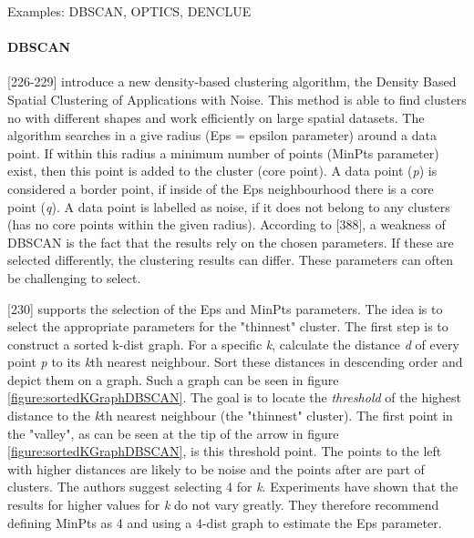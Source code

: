   Examples: DBSCAN, OPTICS, DENCLUE



\paragraph{DBSCAN}
\textcite{DBSCAN}[226-229] introduce a new density-based clustering algorithm, the Density Based Spatial Clustering of Applications with Noise. This method is able to find clusters no with different shapes and work efficiently on large spatial datasets. The algorithm searches in a give radius (Eps = epsilon parameter) around a data point. If within this radius a minimum number of points (MinPts parameter) exist, then this point is added to the cluster (core point). A data point (\textit{p}) is considered a border point, if inside of the Eps neighbourhood there is a core point (\textit{q}). A data point is labelled as noise, if it does not belong to any clusters (has no core points within the given radius).
According to \textcite{han2011data}[388], a weakness of DBSCAN is the fact that the results rely on the chosen parameters. If these are selected differently, the clustering results can differ. These parameters can often be challenging to select.

\textcite{DBSCAN}[230] supports the selection of the Eps and MinPts parameters. The idea is to select the appropriate parameters for the "thinnest" cluster. The first step is to construct a sorted k-dist graph. For a specific \textit{k}, calculate the distance \textit{d} of every point \textit{p} to its \textit{k}th nearest neighbour. Sort these distances in descending order and depict them on a graph. Such a graph can be seen in figure \ref{figure:sortedKGraphDBSCAN}. The goal is to locate the \textit{threshold} of the highest distance to the \textit{k}th nearest neighbour (the "thinnest" cluster). The first point in the "valley", as can be seen at the tip of the arrow in figure \ref{figure:sortedKGraphDBSCAN}, is this threshold point. The points to the left with higher distances are likely to be noise and the points after are part of clusters. The authors suggest selecting 4 for \textit{k}. Experiments have shown that the results for higher values for \textit{k} do not vary greatly. They therefore recommend defining MinPts as 4 and using a 4-dist graph to estimate the Eps parameter.


